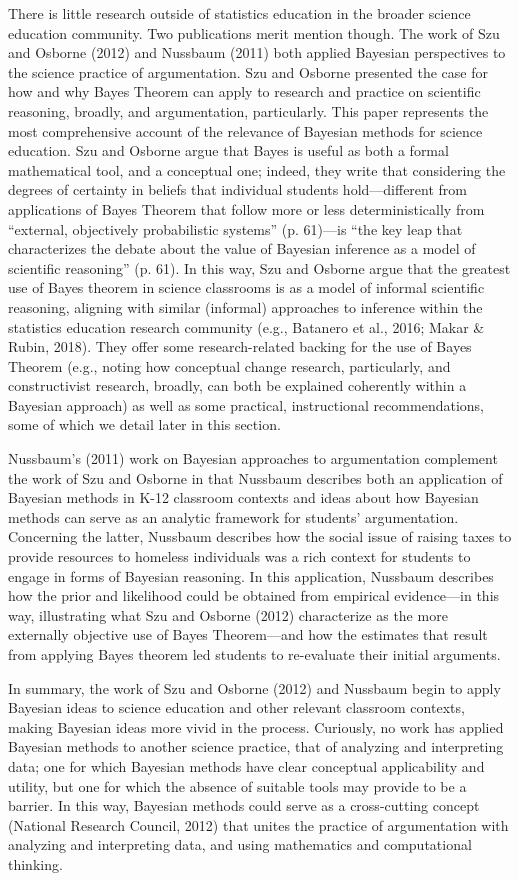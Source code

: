 \documentclass[man]{apa7}
\begin{document}
There is little research outside of statistics education in the broader science education community. Two publications merit mention though. The work of Szu and Osborne (2012) and Nussbaum (2011) both applied Bayesian perspectives to the science practice of argumentation. Szu and Osborne presented the case for how and why Bayes Theorem can apply to research and practice on scientific reasoning, broadly, and argumentation, particularly. This paper represents the most comprehensive account of the relevance of Bayesian methods for science education. Szu and Osborne argue that Bayes is useful as both a formal mathematical tool, and a conceptual one; indeed, they write that considering the degrees of certainty in beliefs that individual students hold—different from applications of Bayes Theorem that follow more or less deterministically from “external, objectively probabilistic systems” (p. 61)—is “the key leap that characterizes the debate about the value of Bayesian inference as a model of scientific reasoning” (p. 61). In this way, Szu and Osborne argue that the greatest use of Bayes theorem in science classrooms is as a model of informal scientific reasoning, aligning with similar (informal) approaches to inference within the statistics education research community (e.g., Batanero et al., 2016; Makar & Rubin, 2018).  They offer some research-related backing for the use of Bayes Theorem (e.g., noting how conceptual change research, particularly, and constructivist research, broadly, can both be explained coherently within a Bayesian approach) as well as some practical, instructional recommendations, some of which we detail later in this section.

Nussbaum’s (2011) work on Bayesian approaches to argumentation complement the work of Szu and Osborne in that Nussbaum describes both an application of Bayesian methods in K-12 classroom contexts and ideas about how Bayesian methods can serve as an analytic framework for students’ argumentation. Concerning the latter, Nussbaum describes how the social issue of raising taxes to provide resources to homeless individuals was a rich context for students to engage in forms of Bayesian reasoning. In this application, Nussbaum describes how the prior and likelihood could be obtained from empirical evidence—in this way, illustrating what Szu and Osborne (2012) characterize as the more externally objective use of Bayes Theorem—and how the estimates that result from applying Bayes theorem led students to re-evaluate their initial arguments. 

In summary, the work of Szu and Osborne (2012) and Nussbaum begin to apply Bayesian ideas to science education and other relevant classroom contexts, making Bayesian ideas more vivid in the process. Curiously, no work has applied Bayesian methods to another science practice, that of analyzing and interpreting data; one for which Bayesian methods have clear conceptual applicability and utility, but one for which the absence of suitable tools may provide to be a barrier. In this way, Bayesian methods could serve as a cross-cutting concept (National Research Council, 2012) that unites the practice of argumentation with analyzing and interpreting data, and using mathematics and computational thinking.
\end{document}
